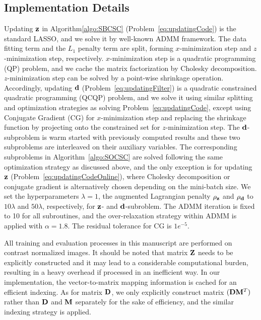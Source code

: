 \subsection{Implementation Details}
Updating $\code$ in Algorithm\ref{algo:SBCSC} (Problem~\ref{eq:updatingCode}) is the standard LASSO, and we solve it by well-known ADMM framework. The data fitting term and the $L_1$ penalty term are split, forming $x$-minimization step and $z$-minimization step, respectively. $x$-minimization step is a quadratic programming (QP) problem, and we cache the matrix factorization by Cholesky decomposition. $z$-minimization step can be solved by a point-wise shrinkage operation. Accordingly, updating $\filter$ (Problem~\ref{eq:updatingFilter}) is a quadratic constrained quadratic programming (QCQP) problem, and we solve it using similar splitting and optimization strategies as solving Problem~\ref{eq:updatingCode}, except using Conjugate Gradient (CG) for $x$-minimization step and replacing the shrinkage function by projecting onto the constrained set for $z$-minimization step. The $\filter$-subproblem is warm started with previously computed results and these two subproblems are interleaved on their auxiliary variables. The corresponding subproblems in Algorithm~\ref{algo:SOCSC} are solved following the same optimization strategy as discussed above, and the only exception is for updating $\code$ (Problem~\ref{eq:updatingCodeOnline}), where Cholesky decomposition or conjugate gradient is alternatively chosen depending on the mini-batch size. We set the hyperparameters $\lambda=1$,  the augmented Lagrangian penalty $\rho_{\code}$ and $\rho_{\filter}$ to $10 \lambda$ and $50 \lambda$, respectively, for $\code$- and $\filter$-subroblem. The ADMM iteration is fixed to 10 for all subroutines, and the over-relaxation strategy within ADMM is applied with $\alpha = 1.8$. The residual tolerance for CG is $1e^{-5}$.

All training and evaluation processes in this manuscript are performed on contrast normalized images. %
It should be noted that matrix $\Code$ needs to be explicitly constructed and it may lead to a considerable computational burden, resulting in a heavy overhead if processed in an inefficient way. In our implementation, the vector-to-matrix mapping information is cached for an efficient indexing. As for matrix $\Filter$, we only explicitly construct matrix $(\Filter \mask^T)$ rather than $\Filter$ and $\mask$ separately for the sake of efficiency, and the similar indexing strategy is applied.